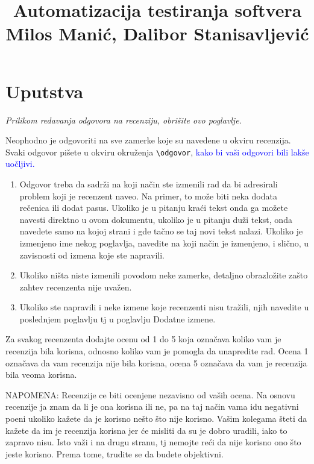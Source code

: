 \documentclass[a4paper]{report}
\newcommand{\odgovor}[1]{\textcolor{blue}{#1}}
\begin{document}
\title{Automatizacija testiranja softvera\\ \small{Milos Manić, Dalibor Stanisavljević}}

\maketitle
\tableofcontents

\chapter{Uputstva}
\emph{Prilikom redavanja odgovora na recenziju, obrišite ovo poglavlje.}

Neophodno je odgovoriti na sve zamerke koje su navedene u okviru recenzija. Svaki odgovor pišete u okviru okruženja \verb"\odgovor", \odgovor{kako bi vaši odgovori bili lakše uočljivi.} 
\begin{enumerate}

\item Odgovor treba da sadrži na koji način ste izmenili rad da bi adresirali problem koji je recenzent naveo. Na primer, to može biti neka dodata rečenica ili dodat pasus. Ukoliko je u pitanju kraći tekst onda ga možete navesti direktno u ovom dokumentu, ukoliko je u pitanju duži tekst, onda navedete samo na kojoj strani i gde tačno se taj novi tekst nalazi. Ukoliko je izmenjeno ime nekog poglavlja, navedite na koji način je izmenjeno, i slično, u zavisnosti od izmena koje ste napravili. 

\item Ukoliko ništa niste izmenili povodom neke zamerke, detaljno obrazložite zašto zahtev recenzenta nije uvažen.

\item Ukoliko ste napravili i neke izmene koje recenzenti nisu tražili, njih navedite u poslednjem poglavlju tj u poglavlju Dodatne izmene.
\end{enumerate}

Za svakog recenzenta dodajte ocenu od 1 do 5 koja označava koliko vam je recenzija bila korisna, odnosno koliko vam je pomogla da unapredite rad. Ocena 1 označava da vam recenzija nije bila korisna, ocena 5 označava da vam je recenzija bila veoma korisna. 

NAPOMENA: Recenzije ce biti ocenjene nezavisno od vaših ocena. Na osnovu recenzije ja znam da li je ona korisna ili ne, pa na taj način vama idu negativni poeni ukoliko kažete da je korisno nešto što nije korisno. Vašim kolegama šteti da kažete da im je recenzija korisna jer će misliti da su je dobro uradili, iako to zapravo nisu. Isto važi i na drugu stranu, tj nemojte reći da nije korisno ono što jeste korisno. Prema tome, trudite se da budete objektivni. 
\end{document}

